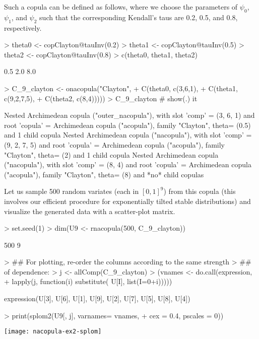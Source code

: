 \documentclass[nojss,article]{jss}
\theoremstyle{mythmstyle}
\begin{document}
Such a copula can be defined as follows, where we choose the parameters of
$\psi_0$, $\psi_1$, and $\psi_2$ such that the corresponding Kendall's taus are
0.2, 0.5, and 0.8, respectively.
\begin{Schunk}
\begin{Sinput}
> theta0 <- copClayton@tauInv(0.2)
> theta1 <- copClayton@tauInv(0.5)
> theta2 <- copClayton@tauInv(0.8)
> c(theta0, theta1, theta2)
\end{Sinput}
\begin{Soutput}
[1] 0.5 2.0 8.0
\end{Soutput}
\begin{Sinput}
> C_9_clayton <- onacopula("Clayton",
+                          C(theta0, c(3,6,1),
+                            C(theta1, c(9,2,7,5),
+                              C(theta2, c(8,4)))))
> C_9_clayton # show(.) it
\end{Sinput}
\begin{Soutput}
Nested Archimedean copula ("outer_nacopula"), with slot 
'comp'   = (3, 6, 1)  and root
'copula' = Archimedean copula ("acopula"), family "Clayton", theta= (0.5)
and 1 child copula
   Nested Archimedean copula ("nacopula"), with slot 
   'comp'   = (9, 2, 7, 5)  and root
   'copula' = Archimedean copula ("acopula"), family "Clayton", theta= (2)
   and 1 child copula
      Nested Archimedean copula ("nacopula"), with slot 
      'comp'   = (8, 4)  and root
      'copula' = Archimedean copula ("acopula"), family "Clayton", theta= (8)
      and *no* child copulas
\end{Soutput}
\end{Schunk}

Let us sample 500 random variates (each in $[0,1]^9$) from this copula
(this involves our efficient procedure for exponentially tilted stable
distributions) and visualize the generated data with a scatter-plot matrix.
\begin{Schunk}
\begin{Sinput}
> set.seed(1)
> dim(U9 <- rnacopula(500, C_9_clayton))
\end{Sinput}
\begin{Soutput}
[1] 500   9
\end{Soutput}
\begin{Sinput}
> ## For plotting, re-order the columns according to the same strength
> ## of dependence:
> j <- allComp(C_9_clayton)
> (vnames <- do.call(expression,
+                    lapply(j, function(i) substitute( U[I], list(I=0+i)))))
\end{Sinput}
\begin{Soutput}
expression(U[3], U[6], U[1], U[9], U[2], U[7], U[5], U[8], U[4])
\end{Soutput}
\begin{Sinput}
> print(splom2(U9[, j], varnames= vnames,
+              cex = 0.4, pscales = 0))
\end{Sinput}
\end{Schunk}
\texttt{[image: nacopula-ex2-splom]}
\end{document}
